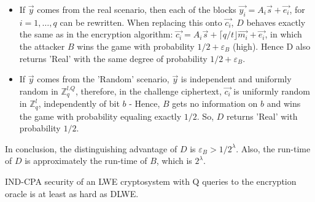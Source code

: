 \begin{description}
\begin{description}
\begin{itemize}
    \item If $\vec{y}$ comes from the real scenario, then each of
      the blocks $\vec{y_i} = A_i\vec{s} + \vec{e_i}$, for $i = 1,\dots,q$ can be rewritten. When
      replacing this onto $\vec{c_i}$, $D$ behaves exactly the same
      as in the encryption algorithm:
      $\vec{c_i} = A_i\vec{s} + \lceil q/t \rfloor \vec{m_i} + \vec{e_i}$, in
      which the attacker $B$ wins the game with probability
      $1/2 + \varepsilon_B$ (high). Hence D also returns 'Real' with the same degree of probability
      $1/2 + \varepsilon_B$.
    \item If $\vec{y}$ comes from the 'Random' scenario, $\vec{y}$ is
      independent and uniformly random in $\mathbb{Z}_q^{l.Q}$, therefore, in the
      challenge ciphertext, $\vec{c_i}$ is uniformly random in $\mathbb{Z}_q^l$,
      independently of bit $b$ - Hence, $B$ gets no information on $b$ and wins
      the game with probability equaling exactly $1/2$. So, $D$ returns 'Real' with
      probability $1/2$.
    \end{itemize}
    In conclusion, the distinguishing advantage of $D$ is
    $\varepsilon_B > 1/2^\lambda$. Also, the run-time of $D$ is approximately
    the run-time of $B$, which is $2^\lambda$.
    \begin{theorem}
      IND-CPA security of an LWE cryptosystem with Q queries to the encryption
      oracle is at least as hard as DLWE.
      \label{theo:reductionCPADLWE}
    \end{theorem}


  \end{description}


\end{description}

